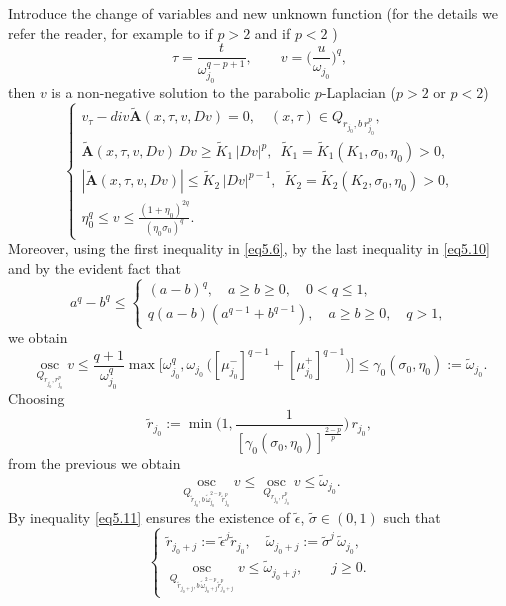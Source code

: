 \documentclass[a4paper,11pt,fullpage]{article}
\DeclareMathOperator*{\osc}{osc}
\numberwithin{equation}{section}
\begin{document}
Introduce the change of variables and new unknown function (for the details we refer the reader, for example to \cite[Section 4.5]{Bog2} if $p>2$ and \cite[Section 4.5]{Lia} if $p<2$ )
$$\tau=\frac{t}{\omega^{q-p+1}_{j_0}},\qquad v=\Big(\frac{u}{\omega_{j_0}}\Big)^q,$$
then $v$ is a non-negative solution to the  parabolic $p$-Laplacian ($p>2$  or $p<2$)
\begin{equation}\label{eq5.10}
\begin{cases}
v_\tau-div\tilde{\mathbf{A}}(x, \tau, v, D v)=0,\quad (x, \tau)\in Q_{r_{j_0}, b\, r^p_{j_0}},\\
\tilde{\mathbf{A}}(x, \tau, v, D v)\,D v\geqslant \tilde{K}_1\,|D v|^p,\,\,\,\tilde{K}_1=\tilde{K}_1(K_1, \sigma_0, \eta_0)>0,\\
|\tilde{\mathbf{A}}(x, \tau, v, D v)|\leqslant \tilde{K}_2\,|D v|^{p-1},\,\,\,\tilde{K}_2=\tilde{K}_2(K_2, \sigma_0, \eta_0)>0,\\
\eta_0^q\leqslant v\leqslant \frac{(1+\eta_0)^{2q}}{(\eta_0 \sigma_0)^q}.
\end{cases}
\end{equation}
Moreover, using the first inequality in \eqref{eq5.6}, by the last inequality in \eqref{eq5.10} and by the evident fact that 
\begin{equation*}
a^q-b^q\leqslant
\begin{cases}
(a-b)^q,\quad a\geqslant b\geqslant 0,\quad 0<q\leqslant1,\\
q(a-b)(a^{q-1}+b^{q-1}),\quad a\geqslant b\geqslant 0,\quad q>1,
\end{cases}
\end{equation*}
we obtain
\begin{equation*}
\osc\limits_{Q_{r_{j_0}, r^p_{j_0}}} v\leqslant \frac{q+1}{\omega^q_{j_0}}\max\Big[\omega^q_{j_0}, \omega_{j_0}\,\Big([\mu^-_{j_0}]^{q-1}+[\mu^+_{j_0}]^{q-1}\Big) \Big]\leqslant \gamma_0(\sigma_0, \eta_0):=\tilde{\omega}_{j_0}.
\end{equation*}
Choosing
$$
\tilde{r}_{j_0}:=
\min\big(1, \frac{1}{[\gamma_0(\sigma_0, \eta_0)]^{\frac{2-p}{p}}}\big)\,r_{j_0},
$$
from the previous we obtain
\begin{equation}\label{eq5.11}
\osc\limits_{Q_{\tilde{r}_{j_0}, b\,\tilde{\omega}^{2-p}_{j_0} \tilde{r}^p_{j_0}}} v\leqslant \osc\limits_{Q_{r_{j_0}, r^p_{j_0}}} v\leqslant \tilde{\omega}_{j_0}.
\end{equation}
By \cite[Chapters 3, 4]{DiB1} inequality \eqref{eq5.11} ensures the existence of $\tilde{\epsilon}$, $\tilde{\sigma}\in (0, 1)$
such that 
\begin{equation}\label{eq5.12}
\begin{cases}
\tilde{r}_{j_0+j}:=\tilde{\epsilon}^j \tilde{r}_{j_0},\quad \tilde{\omega}_{j_0+j}:=\tilde{\sigma}^j\,\tilde{\omega}_{j_0},\\
\osc\limits_{Q_{\tilde{r}_{j_0+j}, b\,\tilde{\omega}^{2-p}_{j_0+j} \tilde{r}^p_{j_0+j}}} v\leqslant \tilde{\omega}_{j_0+j},\qquad j\geqslant 0.
\end{cases}
\end{equation}
\end{document}
